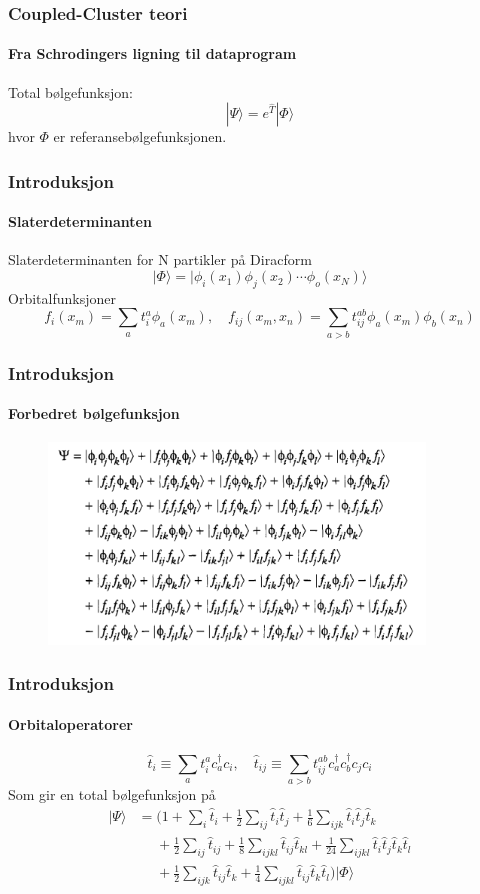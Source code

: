 \documentclass[norsk,a4paper,12pt]{beamer}
\begin{document}
  \begin{frame}
    \frametitle{Coupled-Cluster teori}
    \framesubtitle{Fra Schrodingers ligning til dataprogram}
    Total bølgefunksjon:
    \begin{equation}
    |\Psi\rangle=e^{\hat{T}}|\Phi\rangle
    \end{equation}
  hvor $\Phi$ er referansebølgefunksjonen. 
    
  \end{frame}
  \begin{frame}
    \frametitle{Introduksjon}
    \framesubtitle{Slaterdeterminanten}
    Slaterdeterminanten for N partikler på Diracform
    \begin{equation}
    |\Phi\rangle=|\phi_i(x_1)\phi_j(x_2)\cdots\phi_o(x_N)\rangle
    \end{equation}
    Orbitalfunksjoner
    \begin{equation}
    f_i(x_m)=\sum_a t_i^a\phi_a(x_m),\quad f_{ij}(x_m,x_n)=\sum_{a>b}t_{ij}^{ab}\phi_a(x_m)\phi_b(x_n)
    \end{equation}
  \end{frame}
  \begin{frame}
    \frametitle{Introduksjon}
    \framesubtitle{Forbedret bølgefunksjon}
    \begin{figure}[h]
\centering
\includegraphics[width=100mm]{total_wf.png}
\end{figure}
  \end{frame}
  \begin{frame}
    \frametitle{Introduksjon}
    \framesubtitle{Orbitaloperatorer}
    \begin{equation}
    \hat{t}_i\equiv \sum_a t_i^a c_a^{\dagger}c_i,\quad \hat{t}_{ij}\equiv\sum_{a>b}t_{ij}^{ab}c_a^{\dagger}c_b^{\dagger}c_jc_i
    \end{equation}
    Som gir en total bølgefunksjon på 
    \begin{align*}
    |\Psi\rangle&=\bigg(1+\sum_i\hat{t}_i+\frac{1}{2}\sum_{ij}\hat{t}_i\hat{t}_j+\frac{1}{6}\sum_{ijk}\hat{t}_i\hat{t}_j\hat{t}_k\\
    &\mathrel{\phantom{=}}+\frac{1}{2}\sum_{ij}\hat{t}_{ij}
    +\frac{1}{8}\sum_{ijkl}\hat{t}_{ij}\hat{t}_{kl}+\frac{1}{24}\sum_{ijkl}\hat{t}_i\hat{t}_j\hat{t}_k\hat{t}_l\\
    &\mathrel{\phantom{=}}+\frac{1}{2}\sum_{ijk}\hat{t}_{ij}\hat{t}_k+\frac{1}{4}\sum_{ijkl}\hat{t}_{ij}\hat{t}_k\hat{t}_l\bigg)|\Phi\rangle
    \end{align*}
    
  \end{frame}
\end{document}
